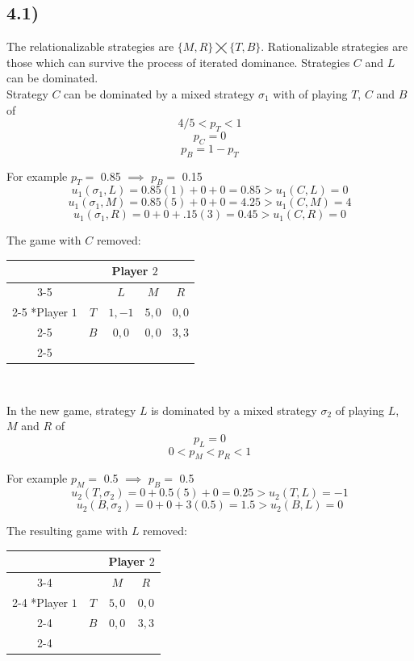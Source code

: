 \documentclass[a4paper,11pt]{article}
\begin{document}
\subsection*{4.1)}

The relationalizable strategies are $\{M, R\} \bigtimes \{T, B\}$.
Rationalizable strategies are those which can survive the process of iterated dominance.
Strategies $C$ and $L$ can be dominated.
\\

Strategy $C$ can be dominated by a mixed strategy $\sigma_1$ with of playing $T$, $C$ and $B$ 
of
\[4/5 < p_T < 1 \]
\[p_C = 0 \] 
\[p_B  = 1 - p_T \]

For example $p_T =$ 0.85 $\implies$ $p_B =$ 0.15
\[ u_1(\sigma_1, L) = 0.85(1) + 0 + 0 = 0.85 > u_1(C, L) = 0\] 
\[ u_1(\sigma_1, M) = 0.85(5) + 0 + 0 = 4.25 > u_1(C, M) = 4\]
\[ u_1(\sigma_1, R) = 0 + 0 + .15(3) = 0.45 > u_1(C, R) = 0\]

\vspace{1cm}
The game with $C$ removed:
\begin{table}[htbp]
  \setlength{\extrarowheight}{2pt}
  \begin{center}
  \begin{tabular}{*{5}{c|}}
    \multicolumn{2}{c}{} & \multicolumn{2}{c}{Player $2$}\\\cline{3-5}
    \multicolumn{1}{c}{}       &     &   $L$ &   $M$ & $R$ \\\cline{2-5}
    \multirow{2}*{Player $1$}  & $T$ & $1,-1$ & $5,0$ & $0,0$ \\\cline{2-5}
                               & $B$ & $0,0$  & $0,0$ & $3,3$ \\\cline{2-5}
  \end{tabular}\\
  \end{center}
\end{table}

In the new game, strategy $L$ is dominated by a mixed strategy $\sigma_2$ of playing $L$, $M$ and $R$ of
\[ p_L = 0 \]
\[ 0 < p_M < p_R < 1 \]

For example $p_M =$ 0.5 $\implies$ $p_B =$ 0.5
\[ u_2(T, \sigma_2) = 0 + 0.5(5) + 0 = 0.25 > u_2(T, L) = -1 \]
\[ u_2(B, \sigma_2) = 0 + 0 + 3(0.5) = 1.5 > u_2(B, L) = 0 \]

\vspace{1cm}
The resulting game with $L$ removed:
\begin{table}[htbp]
  \setlength{\extrarowheight}{2pt}
  \begin{center}
  \begin{tabular}{*{4}{c|}}
    \multicolumn{2}{c}{} & \multicolumn{2}{c}{Player $2$}\\\cline{3-4}
    \multicolumn{1}{c}{}       &     &   $M$ & $R$ \\\cline{2-4}
    \multirow{2}*{Player $1$}  & $T$ & $5,0$ & $0,0$ \\\cline{2-4}
                               & $B$ & $0,0$ & $3,3$ \\\cline{2-4}
  \end{tabular}\\
  \end{center}
\end{table}
\end{document}
